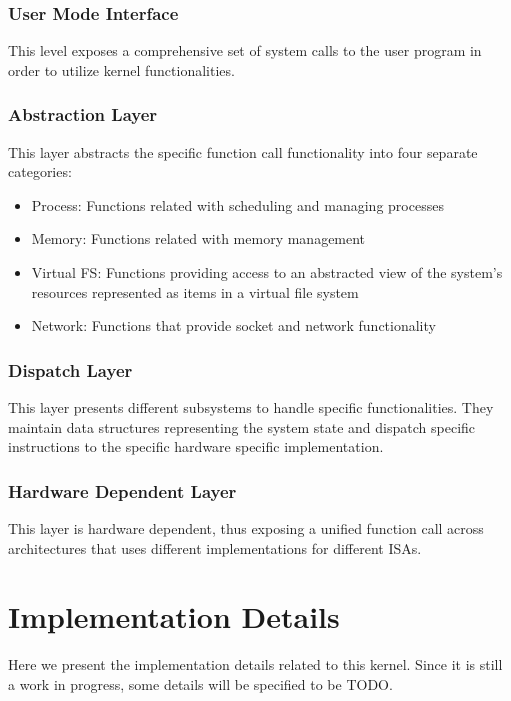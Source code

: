 \documentclass[conference]{IEEEtran}
\begin{document}
\subsubsection{User Mode Interface}

This level exposes a comprehensive set of system calls to the user program in order to utilize kernel functionalities.

\subsubsection{Abstraction Layer}

This layer abstracts the specific function call functionality into four separate categories:

\begin{itemize}
		\item Process: Functions related with scheduling and managing processes
	\item Memory: Functions related with memory management
	\item Virtual FS: Functions providing access to an abstracted view of the system's resources represented as items in a virtual file system
	\item Network: Functions that provide socket and network functionality
\end{itemize}

\subsubsection{Dispatch Layer}

This layer presents different subsystems to handle specific functionalities. They maintain data structures representing the system state and dispatch specific instructions to the specific hardware specific implementation.

\subsubsection{Hardware Dependent Layer}

This layer is hardware dependent, thus exposing a unified function call across architectures that uses different implementations for different ISAs.

\section{Implementation Details}

Here we present the implementation details related to this kernel. Since it is still a work in progress, some details will be specified to be TODO.
\end{document}
